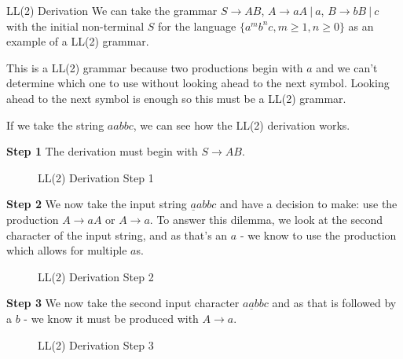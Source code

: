 \begin{example}{LL(2) Derivation}
We can take the grammar $S \rightarrow AB$, $A \rightarrow aA\ |\ a$, $B \rightarrow bB\ |\ c$ with the initial non-terminal $S$ for the language $\{a^mb^nc, m \geq 1, n \geq 0\}$ as an example of a LL(2) grammar.

This is a LL(2) grammar because two productions begin with $a$ and we can't determine which one to use without looking ahead to the next symbol. Looking ahead to the next symbol is enough so this must be a LL(2) grammar.

If we take the string $aabbc$, we can see how the LL(2) derivation works. 

\textbf{Step 1} The derivation must begin with $S \rightarrow AB$.

\begin{figure}[H]
\centering
{}
\caption{LL(2) Derivation Step 1}
\end{figure}

\textbf{Step 2} We now take the input string $\underline{a}abbc$ and have a decision to make: use the production $A \rightarrow aA$ or $A \rightarrow a$. To answer this dilemma, we look at the second character of the input string, and as that's an $a$ - we know to use the production which allows for multiple $a$s.

\begin{figure}[H]
\centering
{}
\caption{LL(2) Derivation Step 2}
\end{figure}

\textbf{Step 3} We now take the second input character $a\underline{a}bbc$ and as that is followed by a $b$ - we know it must be produced with $A \rightarrow a$.

\begin{figure}[H]
\centering
{}
\caption{LL(2) Derivation Step 3}
\end{figure}


\end{example}
